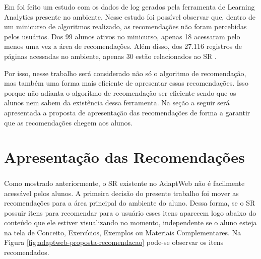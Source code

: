 Em  foi feito um estudo com os dados de log gerados pela ferramenta de Learning Analytics
presente no ambiente. Nesse estudo foi possível observar que, dentro de um minicurso de algoritmos realizado, as
recomendações não foram percebidas pelos usuários. Dos 99 alunos ativos no minicurso, apenas 18 acessaram pelo menos
uma vez a área de recomendações. Além disso, dos 27.116 registros de páginas acessadas no ambiente, apenas 30 estão
relacionados ao SR \cite{de2017sistema}.

Por isso, nesse trabalho será considerado não só o algoritmo de recomendação, mas também uma forma mais eficiente de
apresentar essas recomendações. Isso porque não adianta o algoritmo de recomendação ser eficiente sendo que os alunos
nem sabem da existência dessa ferramenta. Na seção a seguir será apresentada a proposta de apresentação das
recomendações de forma a garantir que as recomendações chegem aos alunos.

\section{Apresentação das Recomendações}

Como mostrado anteriormente, o SR existente no AdaptWeb\textsuperscript{\textregistered} não é facilmente acessável pelos
alunos. A primeira decisão do presente trabalho foi mover as recomendações para a área principal do ambiente do aluno.
Dessa forma, se o SR possuir itens para recomendar para o usuário esses itens aparecem logo abaixo do conteúdo que ele estiver
visualizando no momento, independente se o aluno esteja na tela de Conceito, Exercícios, Exemplos ou Materiais Complementares.
Na Figura \ref{fig:adaptweb-proposta-recomendacao} pode-se observar os itens recomendados.

